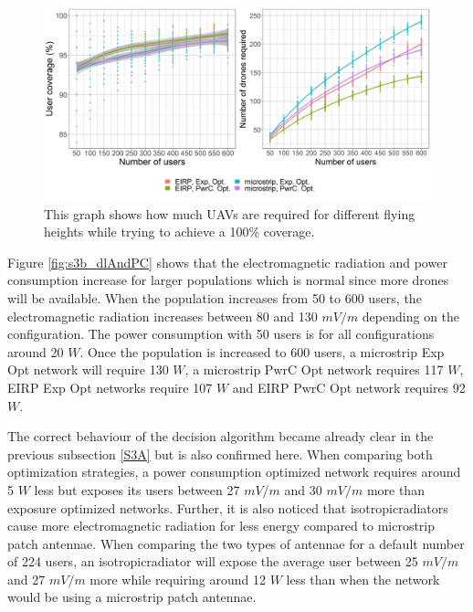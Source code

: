 \documentclass[twocolumn]{phdsymp} %
\begin{document}
\begin{figure}[h]
  \includegraphics[width=\linewidth]{../results/s3/uvsnumdronesAndCov.png}
  \caption{This graph shows how much \acs{UAV}s are required for different flying heights while trying to achieve a 100\% coverage.}
  \label{fig:s3b_numdronesAndCov}
\end{figure}


Figure \ref{fig:s3b_dlAndPC} shows that the electromagnetic radiation and power consumption increase for larger 
populations which is normal since more drones will be available.
When the population increases from 50 to 600 users, the electromagnetic radiation increases 
between 80 and 130 $mV/m$ depending on the configuration. The power consumption with 50 users is for all configurations around 
20 $W$. Once the population is increased to 600 users, a microstrip \gls{Exp Opt} network will require 130 $W$, 
 a microstrip \gls{PwrC Opt} network requires 117 $W$,
\gls{EIRP} \gls{Exp Opt} networks require 107 $W$ and \gls{EIRP} \gls{PwrC Opt} network requires 92 $W$.

The correct behaviour of the decision algorithm became already clear in the previous subsection \ref{S3A} but is also
confirmed here. 
When comparing both optimization strategies, a power consumption optimized network requires around 5 $W$ less but exposes its users between 27 $mV/m$ and 30 $mV/m$ more than
exposure optimized networks. 
Further, it is also noticed that \gls{isotropicradiator}s cause more electromagnetic radiation for less energy
compared to microstrip patch antennae. 
When comparing the two types of antennae for a default number of 224 users, 
an \gls{isotropicradiator} will expose the average user 
between 25 $mV/m$ and 27 $mV/m$ more while requiring around 12 $W$ less than when the network would be using a microstrip patch antennae.
\end{document}
